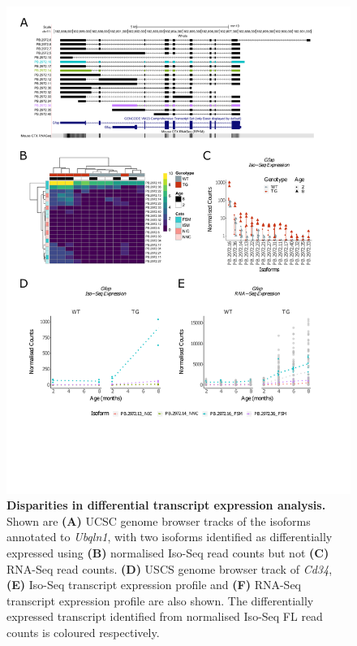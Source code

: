 \begin{figure}[!htp]
	\centering
	\includegraphics[page=3,trim={1.5cm 3cm 2cm 1cm}, scale = 0.80]{Figures/Ch5_DiffPlots.pdf}
	\captionsetup{width=0.95\textwidth}
	\caption[Disparities in differential transcript expression analysis]%
	{\textbf{Disparities in differential transcript expression analysis.} Shown are \textbf{(A)} UCSC genome browser tracks of the isoforms annotated to \textit{Ubqln1}, with two isoforms identified as differentially expressed using \textbf{(B)} normalised Iso-Seq read counts but not \textbf{(C)} RNA-Seq read counts. \textbf{(D)} USCS genome browser track of \textit{Cd34}, \textbf{(E)} Iso-Seq transcript expression profile and \textbf{(F)} RNA-Seq transcript expression profile are also shown. The differentially expressed transcript identified from normalised Iso-Seq FL read counts is coloured respectively. 
	}   
	\label{fig:DEI_cd34_ubq}
\end{figure}


